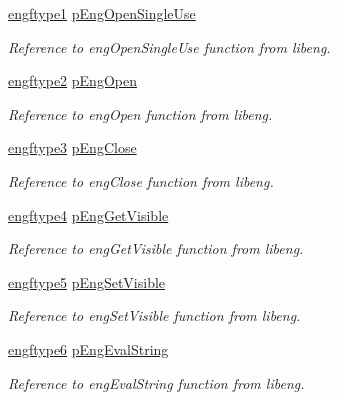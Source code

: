 \begin{DoxyCompactItemize}
\hyperlink{_matlab_library_8h_ac4da6e2ee1808b7028f262b520994543}{engftype1} \hyperlink{class_c_m_a_t_l_a_b_a7b65b3c713cf0ace9fe135b94f2ee007}{p\-Eng\-Open\-Single\-Use}
\begin{DoxyCompactList}\small\item\em Reference to eng\-Open\-Single\-Use function from libeng. \end{DoxyCompactList}\item 
\hyperlink{_matlab_library_8h_a8a03b820f78fb36ce5f8f54c883eafbd}{engftype2} \hyperlink{class_c_m_a_t_l_a_b_a22bf0f3a6218ea5ccbff85e603c12455}{p\-Eng\-Open}
\begin{DoxyCompactList}\small\item\em Reference to eng\-Open function from libeng. \end{DoxyCompactList}\item 
\hyperlink{_matlab_library_8h_a3a87349e792acc67028be136d5704897}{engftype3} \hyperlink{class_c_m_a_t_l_a_b_a2afb20fbe0cb6886567c8ef7e024d4bf}{p\-Eng\-Close}
\begin{DoxyCompactList}\small\item\em Reference to eng\-Close function from libeng. \end{DoxyCompactList}\item 
\hyperlink{_matlab_library_8h_af3f2bab0b2bc988ebc51c2eec3eeb121}{engftype4} \hyperlink{class_c_m_a_t_l_a_b_a0e75bb62637fc4c4a4338ad0ca65e193}{p\-Eng\-Get\-Visible}
\begin{DoxyCompactList}\small\item\em Reference to eng\-Get\-Visible function from libeng. \end{DoxyCompactList}\item 
\hyperlink{_matlab_library_8h_ac134537e723ad0d3c52a9a2119ad37cc}{engftype5} \hyperlink{class_c_m_a_t_l_a_b_aacae3122e2253226427bf5ea2d773a7e}{p\-Eng\-Set\-Visible}
\begin{DoxyCompactList}\small\item\em Reference to eng\-Set\-Visible function from libeng. \end{DoxyCompactList}\item 
\hyperlink{_matlab_library_8h_a4746cb1b1e7fec4353d4519d19b8490e}{engftype6} \hyperlink{class_c_m_a_t_l_a_b_aa244761097ed2374d427ad452e693c4e}{p\-Eng\-Eval\-String}
\begin{DoxyCompactList}\small\item\em Reference to eng\-Eval\-String function from libeng. \end{DoxyCompactList}\item 

\end{DoxyCompactItemize}
